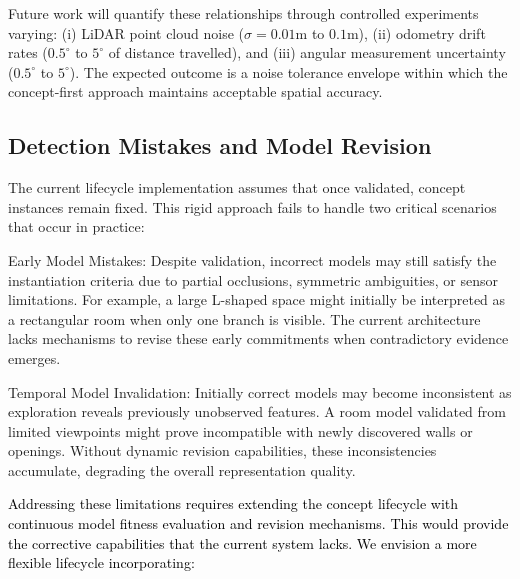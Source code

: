 \documentclass[10pt,a4paper]{article}
\begin{document}
Future work will quantify these relationships through controlled experiments varying: (i) LiDAR point cloud noise ($\sigma = 0.01$m to $0.1$m), (ii) odometry drift rates ($0.5^\circ$ to $5^\circ$ of distance travelled), and (iii) angular measurement uncertainty ($0.5^\circ$ to $5^\circ$). The expected outcome is a noise tolerance envelope within which the concept-first approach maintains acceptable spatial accuracy.

\subsection{Detection Mistakes and Model Revision}

The current lifecycle implementation assumes that once validated, concept instances remain fixed. This rigid approach fails to handle two critical scenarios that occur in practice:

Early Model Mistakes: Despite validation, incorrect models may still satisfy the instantiation criteria due to partial occlusions, symmetric ambiguities, or sensor limitations. For example, a large L-shaped space might initially be interpreted as a rectangular room when only one branch is visible. The current architecture lacks mechanisms to revise these early commitments when contradictory evidence emerges.

Temporal Model Invalidation: Initially correct models may become inconsistent as exploration reveals previously unobserved features. A room model validated from limited viewpoints might prove incompatible with newly discovered walls or openings. Without dynamic revision capabilities, these inconsistencies accumulate, degrading the overall representation quality.

\textcolor{black}{Addressing these limitations requires extending the concept lifecycle with continuous model fitness evaluation and revision mechanisms. This would provide the corrective capabilities that the current system lacks. We envision a more flexible lifecycle incorporating:}
\end{document}

